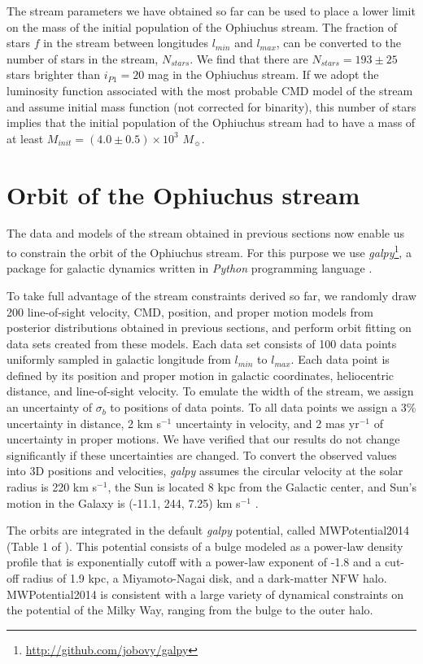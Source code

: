 \documentclass[iop]{emulateapj}
\begin{document}
The stream parameters we have obtained so far can be used to place a lower limit
on the mass of the initial population of the Ophiuchus stream. The fraction of
stars $f$ in the stream between longitudes $l_{min}$ and $l_{max}$, can be
converted to the number of stars in the stream, $N_{stars}$. We find that there
are $N_{stars}=193\pm25$ stars brighter than $i_{P1}=20$ mag in the Ophiuchus
stream. If we adopt the luminosity function associated with the most probable
CMD model of the stream and assume \citet{kro98} initial mass function (not
corrected for binarity), this number of stars implies that the initial
population of the Ophiuchus stream had to have a mass of at least
$M_{init}=(4.0\pm0.5)\times10^3$ $M_{\sun}$.

\section{Orbit of the Ophiuchus stream}\label{orbit}

The data and models of the stream obtained in previous sections now enable us to
constrain the orbit of the Ophiuchus stream. For this purpose we use
{\em galpy}\footnote{\url{http://github.com/jobovy/galpy}}, a package for
galactic dynamics written in {\em Python} programming language \citep{bov15}.

To take full advantage of the stream constraints derived so far, we randomly
draw 200 line-of-sight velocity, CMD, position, and proper motion models from
posterior distributions obtained in previous sections, and perform orbit fitting
on data sets created from these models. Each data set consists of 100 data
points uniformly sampled in galactic longitude from $l_{min}$ to $l_{max}$. Each
data point is defined by its position and proper motion in galactic coordinates,
heliocentric distance, and line-of-sight velocity. To emulate the width of the
stream, we assign an uncertainty of $\sigma_b$ to positions of data points. To
all data points we assign a 3\% uncertainty in distance, 2 km s$^{-1}$
uncertainty in velocity, and 2 mas yr$^{-1}$ of uncertainty in proper motions.
We have verified that our results do not change significantly if these
uncertainties are changed. To convert the observed values into 3D positions and
velocities, {\em galpy} assumes the circular velocity at the solar radius is 220
km s$^{-1}$, the Sun is located 8 kpc from the Galactic center, and Sun's motion
in the Galaxy is (-11.1, 244, 7.25) km s$^{-1}$ \citep{sbd10, bov12}.

The orbits are integrated in the default {\em galpy} potential, called
MWPotential2014 (Table 1 of \citealt{bov15}). This potential
consists of a bulge modeled as a power-law density profile that is exponentially
cutoff with a power-law exponent of -1.8 and a cut-off radius of 1.9 kpc, a
Miyamoto-Nagai disk, and a dark-matter NFW halo. MWPotential2014 is consistent
with a large variety of dynamical constraints on the potential of the Milky Way,
ranging from the bulge to the outer halo.
\end{document}
